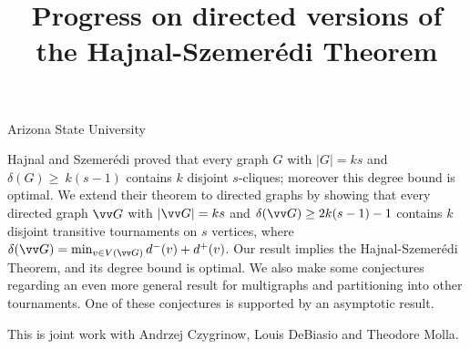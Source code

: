 Arizona State University
\title{Progress on directed versions of the Hajnal-Szemerédi Theorem}
\endtitle


Hajnal and Szemer\'edi proved that every graph $G$ with $|G|=ks$ and $\delta(G)\ge\ k(s-1)$ contains $k$ disjoint $s$-cliques; moreover this degree bound is optimal.  We extend their theorem to directed graphs by showing  that every directed graph $\vv G$ with $|\vv G|=ks$ and $\delta(\vv G)\ge2k(s-1)-1$ contains $k$ disjoint transitive tournaments on $s$ vertices, where $\delta(\vv G)=\min_{v\in V(\vv G)}d^-(v)+d^+(v)$. Our result implies the Hajnal-Szemer\'edi Theorem, and its degree bound is optimal. We also make some conjectures regarding an even more general result for multigraphs and partitioning into other tournaments. One of these conjectures is supported by an asymptotic result.

This is joint work with  Andrzej Czygrinow, Louis DeBiasio and Theodore Molla.